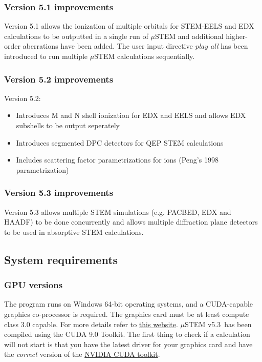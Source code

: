 \documentclass[12pt,a4paper]{article}
\newcommand{\version}{v5.3\ }
\begin{document}
\subsubsection{Version 5.1 improvements}

Version 5.1 allows the ionization of multiple orbitals for STEM-EELS and EDX calculations to be outputted in a single run of $\mu$STEM and additional higher-order aberrations have been added. The user input directive \emph{play all} has been introduced to run multiple $\mu$STEM calculations sequentially.

\subsubsection{Version 5.2 improvements}

Version 5.2: 
\begin{itemize}
	\item Introduces M and N shell ionization for EDX and EELS and allows EDX subshells to be output seperately
	\item Introduces segmented DPC detectors for QEP STEM calculations
	\item Includes scattering factor parametrizations for ions (Peng's 1998 parametrization) 
\end{itemize}

\subsubsection{Version 5.3 improvements}

Version 5.3 allows multiple STEM simulations (e.g. PACBED, EDX and HAADF) to be done concurrently and allows multiple diffraction plane detectors to be used in absorptive STEM calculations.


\subsection{System requirements}
\subsubsection{GPU versions}
The program runs on Windows 64-bit operating systems, and a CUDA-capable graphics co-processor is required. The graphics card must be at least compute class 3.0 capable.
For more details refer to \href{https://developer.nvidia.com/cuda-gpus}{this website}. $\mu$STEM \version has been compiled using the CUDA 9.0 Toolkit. The first thing to check if a calculation will not start is that you have the latest driver for your graphics card and have the \emph{correct} version of the \href{https://developer.nvidia.com/cuda-toolkit-archive}{NVIDIA CUDA toolkit}.
\end{document}
